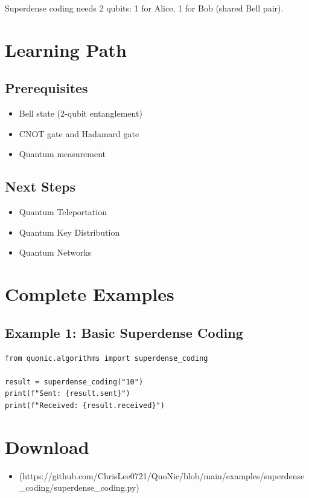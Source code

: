 \documentclass[12pt,a4paper]{article}
\begin{document}
Superdense coding needs 2 qubits: 1 for Alice, 1 for Bob (shared Bell pair).

\section{Learning Path}

\subsection{Prerequisites}
\begin{itemize}
  \item Bell state (2-qubit entanglement)
  \item CNOT gate and Hadamard gate
  \item Quantum measurement
\end{itemize}

\subsection{Next Steps}
\begin{itemize}
  \item Quantum Teleportation
  \item Quantum Key Distribution
  \item Quantum Networks
\end{itemize}

\section{Complete Examples}

\subsection{Example 1: Basic Superdense Coding}

\begin{verbatim}
from quonic.algorithms import superdense_coding

result = superdense_coding("10")
print(f"Sent: {result.sent}")
print(f"Received: {result.received}")
\end{verbatim}

\section{Download}

\begin{itemize}
  \item [superdense\_coding.py](https://github.com/ChrisLee0721/QuoNic/blob/main/examples/superdense_coding/superdense_coding.py)
\end{itemize}
\end{document}
